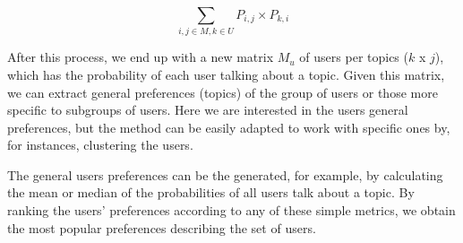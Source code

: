 \begin{equation}
\label{eq:fase3}
\sum_{i,j \in M,  k \in U} {P_{i,j} \times P_{k,i}}
\end{equation}

After this process, we end up with a new matrix $M_u$ of users per topics ($k$ x $j$), which has the probability of each user talking about a topic.
Given this matrix, we can extract general preferences (topics) of the group of users or those more specific to subgroups of users. Here we are interested in the users general preferences, but the method can be easily adapted to work with specific ones by, for instances, clustering the users. 

The general users preferences can be the generated, for example, by calculating the mean or median of the probabilities of all users talk about a topic. By ranking the users' preferences according to any of these simple metrics, we obtain the most popular preferences describing the set of users.
